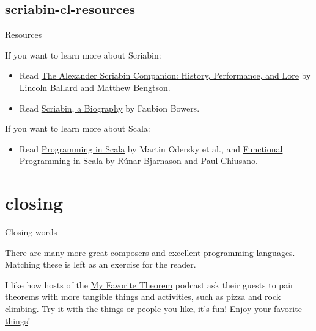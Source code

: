 \documentclass{article}
\begin{document}
\subsection{scriabin-cl-resources}{Resources}

If you want to learn more about Scriabin:
\begin{itemize}
  \item
  Read \href{https://www.amazon.com/Alexander-Scriabin-Companion-History-Performance/dp/1442232617/}{The Alexander Scriabin Companion: History, Performance, and Lore} by Lincoln Ballard and Matthew Bengtson.
  \item
  Read \href{https://www.amazon.com/Scriabin-Biography-Second-Revised-Dover/dp/0486288978/}{Scriabin, a Biography} by Faubion Bowers.
\end{itemize}

If you want to learn more about Scala:
\begin{itemize}
    \item
    Read \href{https://www.amazon.com/Programming-Scala-Fifth-Odersky-dp-0997148004/dp/0997148004/}{Programming in Scala} by Martin Odersky et al., and \href{https://www.amazon.com/gp/product/1617290653/}{Functional Programming in Scala} by Rúnar Bjarnason and Paul Chiusano.
\end{itemize}

\section{closing}{Closing words}

There are many more great composers and excellent programming languages.
Matching these is left as an exercise for the reader.

I like how hosts of the \href{https://kpknudson.com/my-favorite-theorem/}{My Favorite Theorem} podcast ask their guests to pair theorems with more tangible things and activities,
such as pizza and rock climbing.
Try it with the things or people you like, it's fun!
Enjoy your \href{https://www.youtube.com/watch?v=2G6dd7ikrXs}{favorite things}!
\end{document}
